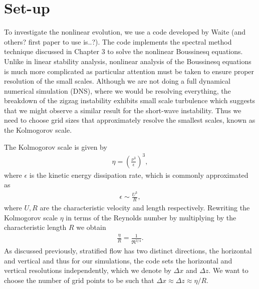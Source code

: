 \section{Set-up} 
To investigate the nonlinear evolution, we use a code developed by Waite (and others? first paper to use is..?). The code implements the spectral method technique discussed in Chapter 3 to solve the nonlinear Boussinesq equations. Unlike in linear stability analysis, nonlinear analysis of the Boussinesq equations is much more complicated as particular attention must be taken to ensure proper resolution of the small scales. Although we are not doing a full dynamical numerical simulation (DNS), where we would be resolving everything, the breakdown of the zigzag instability exhibits small scale turbulence which suggests that we might observe a similar result for the short-wave instability. Thus we need to choose grid sizes that approximately resolve the smallest scales, known as the Kolmogorov scale. 

The Kolmogorov scale is given by \cite{lesieur}
\begin{align}
\eta = \left(\frac{\nu^{3}}{\epsilon}\right)^{3},
\end{align}
where $\epsilon$ is the kinetic energy dissipation rate, which is commonly approximated as \cite{lindborg2006}
\begin{align}
\epsilon \sim \frac{U^{3}}{R} ,
\end{align}
where $U,R$ are the characteristic velocity and length respectively. Rewriting the Kolmogorov scale $\eta$ in terms of the Reynolds number by multiplying by the characteristic length $R$ we obtain
\begin{align}
\frac{\eta}{R} = \frac{1}{\Re^{3/4}}.
\end{align}
As discussed previously, stratified flow has two distinct directions, the horizontal and vertical and thus for our simulations, the code sets the horizontal and vertical resolutions independently, which we denote by $\Delta x$ and $\Delta z$. We want to choose the number of grid points to be such that $\Delta x \approx \Delta z \approx \eta/R$.

